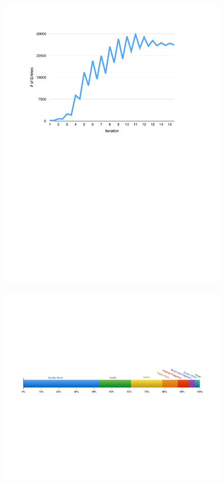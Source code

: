 \documentclass[11pt, oneside, fleqn]{article}
\begin{document}
  \begin{figure}[h]
  \includegraphics{./figure/entropy_per_iteration.pdf}
  \end{figure}

  \begin{figure}[h]
  \includegraphics[scale=0.6]{./figure/error_nature_classfier.pdf}
  \end{figure}
  
\end{document}
